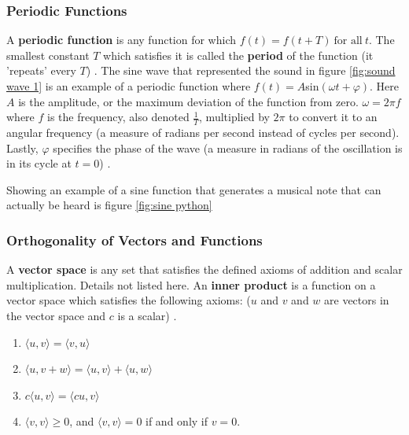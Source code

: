\documentclass[10pt]{article}
\begin{document}
\subsubsection{Periodic Functions}
\hspace{\parindent} A \textbf{periodic function} is any function for which $f(t) = f(t + T) \: \text{for all} \: t$.
The smallest constant $T$ which satisfies it is called the \textbf{period} of the function (it 'repeats' every $T$) \cite{hsu1970fourier}. The sine wave that represented the sound in figure \ref{fig:sound wave 1} is an example of a periodic function where $f(t)=A$sin$(\omega t+\varphi)$. Here $A$ is the amplitude, or the maximum deviation of the function from zero. $\omega=2\pi f$ where $f$ is the frequency, also denoted $\frac{1}{T}$, multiplied by $2\pi$ to convert it to an angular frequency (a measure of radians per second instead of cycles per second). Lastly, $\varphi$ specifies the phase of the wave (a measure in radians of the oscillation is in its cycle at $t=0$) \cite{sineWiki} \cite{angularFrequency}.

Showing an example of a sine function that generates a musical note that can actually be heard is figure \ref{fig:sine python}






\subsubsection{Orthogonality of Vectors and Functions}
\hspace{\parindent} A \textbf{vector space} is any set that satisfies the defined axioms of addition and scalar multiplication. Details not listed here. An \textbf{inner product} is a function on a vector space which satisfies the following axioms: ($u$ and $v$ and $w$ are vectors in the vector space and $c$ is a scalar) \cite{shields1968linearalgebra}.
\begin{enumerate}
    \item $\langle u, v \rangle = \langle v, u \rangle$
    \item $\langle u, v + w \rangle = \langle u, v \rangle + \langle u, w \rangle$
    \item $c \langle u, v \rangle = \langle cu, v \rangle$
    \item $\langle v, v \rangle \geq 0$, and $\langle v, v \rangle = 0$ if and only if $v = 0.$
\end{enumerate}
\end{document}
